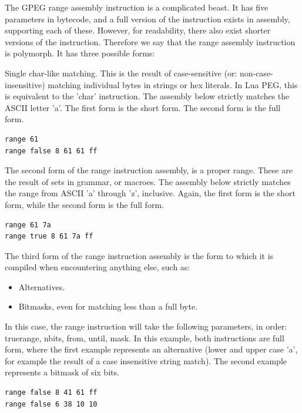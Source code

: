 The GPEG range assembly instruction is a complicated beast.
It has five parameters in bytecode, and a full version of the
instruction exists in assembly, supporting each of these.
However, for readability, there also exist shorter versions of the instruction.
Therefore we say that the range assembly instruction is polymorph.
It has three possible forms:

Single char-like matching. This is the result of case-sensitive
(or: non-case-insensitive) matching individual bytes in strings or
hex literals. In Lua PEG, this is equivalent to the 'char' instruction.
The assembly below strictly matches the ASCII letter 'a'.
The first form is the short form. The second form is the full form.

\begin{myquote}
\begin{verbatim}
range 61
range false 8 61 61 ff
\end{verbatim}
\end{myquote}

The second form of the range instruction assembly, is a proper range.
These are the result of sets in grammar, or macroes.
The assembly below strictly matches the range from ASCII 'a' through 'z',
inclusive. Again, the first form is the short form, while the second
form is the full form.

\begin{myquote}
\begin{verbatim}
range 61 7a
range true 8 61 7a ff
\end{verbatim}
\end{myquote}

The third form of the range instruction assembly is the form to which
it is compiled when encountering anything else, such as:

\begin{itemize}
\item Alternatives.
\item Bitmasks, even for matching less than a full byte.
\end{itemize}

In this case, the range instruction will take the following parameters,
in order: truerange, nbits, from, until, mask. In this example, both
instructions are full form, where the first example represents an
alternative (lower and upper case 'a', for example the result of a
case insensitive string match). The second example represents a bitmask
of six bits.

\begin{myquote}
\begin{verbatim}
range false 8 41 61 ff
range false 6 38 10 10
\end{verbatim}
\end{myquote}
